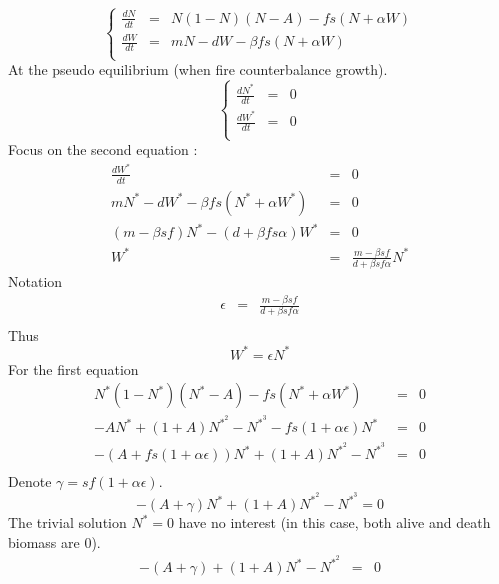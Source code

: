 \documentclass{article}
\begin{document}
\[
\left\lbrace
\begin{array}{rcl}
\frac{dN}{dt} & = & N(1-N)(N-A) - f s (N+\alpha W) \\
\frac{dW}{dt} & = & mN -dW - \beta f s (N+\alpha W) \\
\end{array}
\right.
\]
At the pseudo equilibrium (when fire counterbalance growth).
\[
\left\lbrace
\begin{array}{rcl}
\frac{dN^*}{dt} & = & 0 \\
\frac{dW^*}{dt} & = & 0 \\
\end{array}
\right.
\]
Focus on the second equation : 
\[
\begin{array}{rcl}
\frac{dW^*}{dt} & = & 0 \\
mN^*-dW^* -\beta f s (N^*+\alpha W^*) & = & 0 \\
(m-\beta s f)N^* - (d+\beta f s \alpha) W^* & = & 0 \\
W^* & = & \frac{m-\beta s f}{d + \beta s f \alpha} N^*
\end{array}
\]
Notation
\[
\begin{array}{rcl}
\epsilon & = & \frac{m-\beta s f}{d + \beta s f \alpha} \\
\end{array}
\]
Thus
\[
W^* = \epsilon N^*
\]
For the first equation
\[
\begin{array}{rcl}
N^*(1-N^*)(N^*-A) - f s (N^*+\alpha W^*) & = & 0 \\
-AN^*+(1+A)N^{*^2}-N^{*^3} -f s (1+\alpha\epsilon)N^* & = & 0 \\
-(A+f s (1+\alpha\epsilon))N^*+(1+A)N^{*^2}-N^{*^3} & = & 0 \\
\end{array}
\]
Denote $\gamma = sf(1+\alpha\epsilon)$. 
\begin{equation}
-(A+\gamma)N^*+(1+A)N^{*^2}-N^{*^3} = 0
\end{equation}
The trivial solution $N^* = 0$ have no interest (in this case, both alive and death biomass are $0$).
\[
\begin{array}{rcl}
-(A+\gamma)+(1+A)N^{*}-N^{*^2} & = & 0 \\
\end{array}
\]
\end{document}
